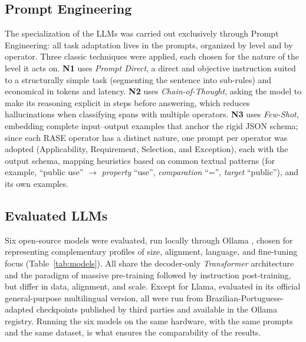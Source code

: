\documentclass[a4paper,fleqn]{cas-sc}
\begin{document}
\subsection{Prompt Engineering}\label{sec:prompt-engineering}
The specialization of the LLMs was carried out exclusively through Prompt Engineering: all task adaptation lives in the prompts, organized by level and by operator. Three classic techniques were applied, each chosen for the nature of the level it acts on. \textbf{N1} uses \textit{Prompt Direct}, a direct and objective instruction suited to a structurally simple task (segmenting the sentence into sub-rules) and economical in tokens and latency. \textbf{N2} uses \textit{Chain-of-Thought}, asking the model to make its reasoning explicit in steps before answering, which reduces hallucinations when classifying spans with multiple operators. \textbf{N3} uses \textit{Few-Shot}, embedding complete input--output examples that anchor the rigid JSON schema; since each RASE operator has a distinct nature, one prompt per operator was adopted (Applicability, Requirement, Selection, and Exception), each with the output schema, mapping heuristics based on common textual patterns (for example, ``public use'' $\rightarrow$ \textit{property} ``use'', \textit{comparation} ``='', \textit{target} ``public''), and its own examples.

\subsection{Evaluated LLMs}\label{sec:models}
Six open-source models were evaluated, run locally through Ollama \citep{ollama2024}, chosen for representing complementary profiles of size, alignment, language, and fine-tuning focus (Table~\ref{tab:models}). All share the decoder-only \textit{Transformer} architecture and the paradigm of massive pre-training followed by instruction post-training, but differ in data, alignment, and scale. Except for Llama, evaluated in its official general-purpose multilingual version, all were run from Brazilian-Portuguese-adapted checkpoints published by third parties and available in the Ollama registry. Running the six models on the same hardware, with the same prompts and the same dataset, is what ensures the comparability of the results.
\end{document}
